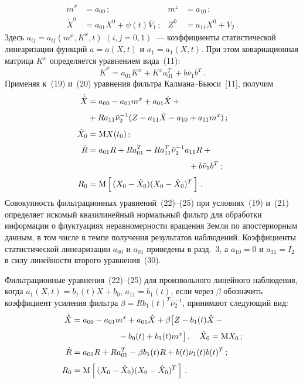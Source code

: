 \begin{multicols}{2}
\noindent
\begin{align}
\dot m^x &= a_{00}\,; & m^z &= a_{10}\,;\\
\dot X^0 &= a_{01} X^0 +\psi (t) \bar V_1\,; & Z^0 &= a_{11} X^0 + V_2\,.
\end{align}
Здесь  $a_{ij} = a_{ij} (m^x, K^x,t)$ $(i,j=0,1)$~--- коэффициенты
статистической линеаризации функций $a=a(X,t)$ и $a_1= a_1 (X,t)$.
При этом ковариационная матрица $K^x$ определяется уравнением вида~(11):
\begin{equation}
\dot K^x = a_{01} K^x + K^x a_{01}^T + b\bar\nu_1 b^T\,.
\end{equation}
Применяя к~(19) и~(20) уравнения фильтра Кал\-ма\-на--Бьюси~[11],
получим
\begin{align}
{\dot{\hat X}} &= a_{00} - a_{01} m^x + a_{01} \hat X +{}\notag\\[3pt]
&  {}+R a_{11} \bar\nu_2^{-1} (Z-a_{11} \hat X - a_{10} + a_{11} m^x)\,;\\[3pt]
\hat X_0 &=\mm X(t_0)\,;\\[3pt]
    \dot R &= a_{01} R + R a_{01}^T - R a_{11}^T \bar \nu_2^{-1} a_{11} R +{}\notag\\[3pt]
    &\ \ \ \ \ \ \ \ \ \ \ \ \ \ \ \ \ \ \ \ \ \ \ \ \ \ \ \ \ \ \ \ \ \ \ \ \ {}+ b\bar \nu_1 b^T\,;\\[3pt]
    R_0 &=\mm \lk (X_0 -\hat X_0)(X_0 -\hat X_0)^T\rk\,.
\end{align}
Совокупность фильтрационных уравнений~(22)--(25) при условиях~(19) и~(21) 
определяет искомый квазилинейный нормальный фильтр для
обработки информации о флуктуациях неравномерности вращения Земли по
апостериорным данным, в том числе в темпе получения результатов
наблюдений. Коэффициенты статистической линеаризации $a_{00}$ и
$a_{01}$ приведены в разд.~3, а  $a_{10}=0$ и $ a_{11} = I_2$ в
силу линейности второго уравнения~(30).

Фильтрационные уравнения~(22)--(25) для произвольного линейного
наблюдения, когда  $a_1(X,t) = b_1 (t) X + b_0$, $ a_{11} = b_1
(t)$, если через  $\beta$ обозначить коэффициент усиления фильтра
$\beta = R b_1 (t)^T \bar\nu_2^{-1}$, принимают следующий вид:
   \begin{align*}
{\dot{\hat X}} &= a_{00} - a_{01} m^x + a_{01} \hat X + \beta \bigl[ Z- b_1(t) \hat X -{}\\[3pt]
&\ \ \ \ \ \ \ \ \ \ \ \ \ \ \  \ \ {}-b_0(t) + b_1(t) m^x\bigr] \,,\quad \hat X_0 ={\rm M} X_0\,;\\[3pt]
\dot R &= a_{01} R + R a_{01}^T - \beta b_1(t) R + b(t) \bar\nu_1 (t) b(t)^T\,;\\[3pt]
R_0 &={\rm M} \left[\, (X_0 -\hat X_0)(X_0 -\hat X_0)^T\,\right]\,.
\end{align*}


\end{multicols}
